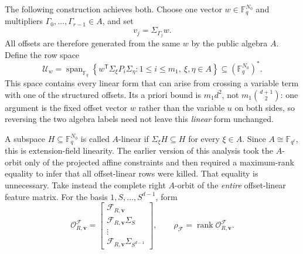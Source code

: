 \documentclass[11pt]{article}
\newcommand{\F}{\mathbb F}
\newcommand{\rank}{\operatorname{rank}}
\newcommand{\Span}{\operatorname{span}}
\newcommand{\transpose}{\mathsf T}
\begin{document}
The following construction achieves both.  Choose one vector
$w\in\F_q^{N_0}$ and multipliers $\Gamma_0,\ldots,\Gamma_{r-1}\in A$, and set
\begin{equation}\label{eq:structured-offsets}
 v_j=\Sigma_{\Gamma_j}w.
\end{equation}
All offsets are therefore generated from the same $w$ by the public algebra
$A$.  Define the row space
\begin{equation}\label{eq:Uw}
 \mathcal U_w=
 \Span_{\F_q}\left\{
 w^\transpose\Sigma_\xi P_i\Sigma_\eta:
 1\le i\le m_1,\ \xi,\eta\in A
 \right\}
 \subseteq(\F_q^{N_0})^*.
\end{equation}
This space contains every linear form that can arise from crossing a variable
term with one of the structured offsets.  Its a priori bound is $m_1d^2$, not
$m_1\binom{d+1}{2}$: one argument is the fixed offset vector $w$ rather than
the variable $u$ on both sides, so reversing the two algebra labels need not
leave this \emph{linear} form unchanged.

A subspace $H\subseteq\F_q^{N_0}$ is called $A$-linear if
$\Sigma_\xi H\subseteq H$ for every $\xi\in A$.  Since
$A\cong\F_{q^\ell}$, this is extension-field linearity.  The earlier version
of this analysis took the $A$-orbit only of the projected affine constraints
and then required a maximum-rank equality to infer that all offset-linear rows
were killed.  That equality is unnecessary.  Take instead the complete right
$A$-orbit of the \emph{entire} offset-linear feature matrix.  For the basis
$1,S,\ldots,S^{d-1}$, form
\begin{equation}\label{eq:orbit-matrix}
 \mathcal O^{\mathcal F}_{R,\mathbf v}=
 \begin{bmatrix}
 \mathcal F_{R,\mathbf v}\\
 \mathcal F_{R,\mathbf v}\Sigma_S\\
 \vdots\\
 \mathcal F_{R,\mathbf v}\Sigma_{S^{d-1}}
 \end{bmatrix},
 \qquad
 \rho_{\mathcal F}=\rank\mathcal O^{\mathcal F}_{R,\mathbf v}.
\end{equation}
\end{document}
